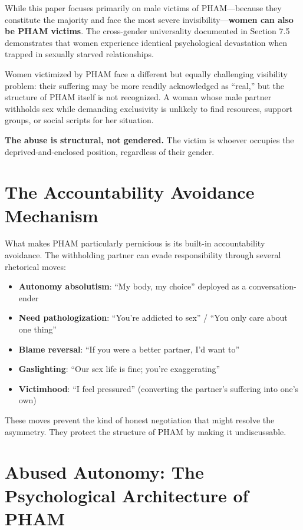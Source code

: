 \documentclass[12pt,openany]{book}
\numberwithin{equation}{chapter}
\begin{document}
While this paper focuses primarily on male victims of PHAM---because they constitute the majority and face the most severe invisibility---\textbf{women can also be PHAM victims}. The cross-gender universality documented in Section 7.5 demonstrates that women experience identical psychological devastation when trapped in sexually starved relationships.

Women victimized by PHAM face a different but equally challenging visibility problem: their suffering may be more readily acknowledged as ``real,'' but the structure of PHAM itself is not recognized. A woman whose male partner withholds sex while demanding exclusivity is unlikely to find resources, support groups, or social scripts for her situation.

\textbf{The abuse is structural, not gendered.} The victim is whoever occupies the deprived-and-enclosed position, regardless of their gender.

\section{The Accountability Avoidance Mechanism}

What makes PHAM particularly pernicious is its built-in accountability avoidance. The withholding partner can evade responsibility through several rhetorical moves:

\begin{itemize}
    \item \textbf{Autonomy absolutism}: ``My body, my choice'' deployed as a conversation-ender
    \item \textbf{Need pathologization}: ``You're addicted to sex'' / ``You only care about one thing''
    \item \textbf{Blame reversal}: ``If you were a better partner, I'd want to''
    \item \textbf{Gaslighting}: ``Our sex life is fine; you're exaggerating''
    \item \textbf{Victimhood}: ``I feel pressured'' (converting the partner's suffering into one's own)
\end{itemize}

These moves prevent the kind of honest negotiation that might resolve the asymmetry. They protect the structure of PHAM by making it undiscussable.

\section{Abused Autonomy: The Psychological Architecture of PHAM}
\end{document}
